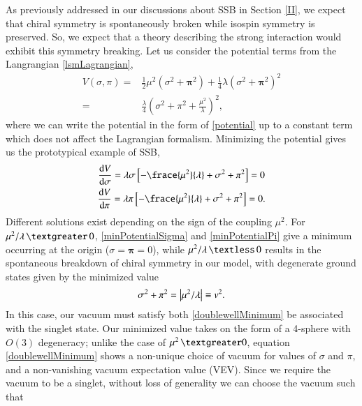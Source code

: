 \documentclass[aps,prd,onecolumn,showpacs,amsmath,amssymb,nofootinbib, 11pt]{revtex4} \pdfoutput=1
\begin{document}
  As previously addressed in our discussions about SSB in Section \ref{II}, we expect that chiral symmetry is spontaneously broken while isospin symmetry is preserved. So, we expect that a theory describing the strong interaction would exhibit this symmetry breaking. Let us consider the potential terms from the Langrangian \eqref{lsmLagrangian},
  \begin{align}
      V(\sigma,\pi) = &\frac{1}{2}\mu^2\left(\sigma^2+\mathbf{\pi}^2\right) + \frac{1}{4}\lambda\left(\sigma^2+\mathbf{\pi}^2\right)^2\\
      = & \frac{\lambda}{4}\left(\sigma^2+\pi^2 + \frac{\mu^2}{\lambda} \right)^2,\label{potential}
  \end{align}
  where we can write the potential in the form of \eqref{potential} up to a constant term which does not affect the Lagrangian formalism. Minimizing the potential gives us the prototypical example of SSB,
  \begin{gather}
      \frac{\mathrm{d}V}{\mathrm{d}\mathbf{\sigma}} = \lambda \sigma \left[ -\frace{\mu^2}{\lambda} + \sigma^2 + \pi^2  \right]=0 \label{minPotentialSigma}\\
      \frac{\mathrm{d}V}{\mathrm{d}\mathbf{\pi}}= \lambda \pi \left[ -\frace{\mu^2}{\lambda} + \sigma^2 + \pi^2  \right]=0 \label{minPotentialPi}.
  \end{gather}
Different solutions exist depending on the sign of the coupling $\mu^2$. For $\mu^2/\lambda \, \textgreater\, 0$, \eqref{minPotentialSigma} and \eqref{minPotentialPi} give a minimum occurring at the origin ($\sigma = \mathbf{\pi} = 0$), while $\mu^2/\lambda \, \textless\, 0$  results in the spontaneous breakdown of chiral symmetry in our model, with degenerate ground states given by the minimized value 
\begin{equation}
    \sigma^2 + \pi^2 = \abs{\mu^2/\lambda} \equiv v^2.
    \label{doublewellMinimum}
\end{equation}
In this case, our vacuum must satisfy both \eqref{doublewellMinimum} be associated with the singlet state. Our minimized value takes on the form of a 4-sphere with $O(3)$ degeneracy; unlike the case of $\mu^2\,\textgreater0$, equation \ref{doublewellMinimum} shows a non-unique choice of vacuum for values of $\sigma$ and $\pi$, and a non-vanishing vacuum expectation value (VEV). Since we require the vacuum to be a singlet, without loss of generality we can choose the vacuum such that
\end{document}
